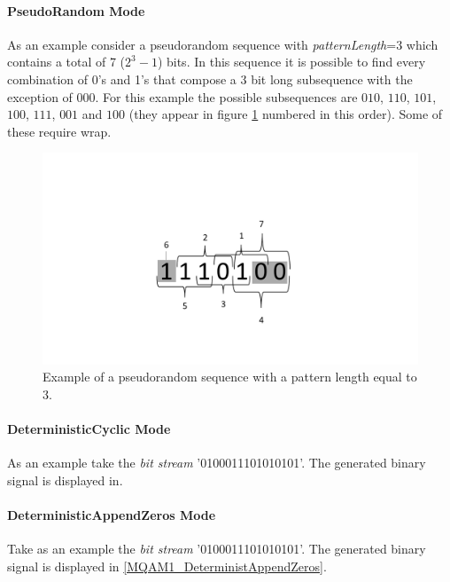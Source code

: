 \paragraph*{PseudoRandom Mode}
As an example consider a pseudorandom sequence with \textit{patternLength}=3 which contains a total of 7 ($2^3-1$) bits. In this sequence it is possible to find every combination of 0's and 1's that compose a 3 bit long subsequence with the exception of $000$. For this example the possible subsequences are $010$, $110$, $101$, $100$, $111$, $001$ and $100$ (they appear in figure \ref{BinarySequenceN3} numbered in this order). Some of these require wrap.

\begin{figure}[h]
	\centering
\includegraphics[width=\textwidth]{./lib/binary_source/figures/BinarySequenceN3.pdf}
\caption{Example of a pseudorandom sequence with a pattern length equal to 3.}\label{BinarySequenceN3}
\end{figure}

\paragraph*{DeterministicCyclic Mode}

As an example take the \textit{bit stream} '0100011101010101'. The generated binary signal is displayed in.

\paragraph*{DeterministicAppendZeros Mode}

Take as an example the \textit{bit stream} '0100011101010101'. The generated binary signal is displayed in \ref{MQAM1_DeterministAppendZeros}.

